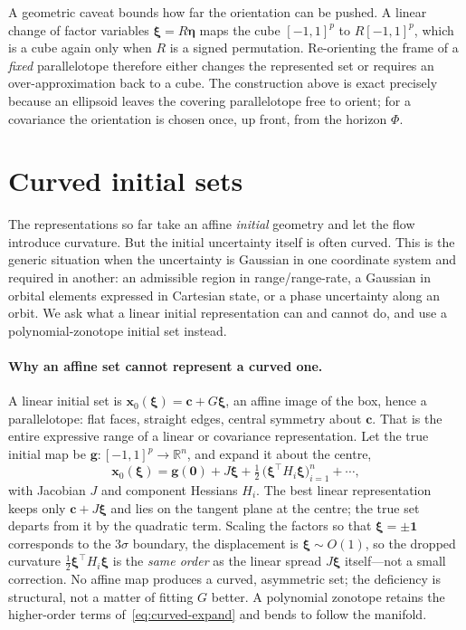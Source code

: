 \documentclass[11pt]{article}
\newcommand{\R}{\mathbb{R}}
\newcommand{\bx}{\bm{x}}
\newcommand{\bxi}{\bm{\xi}}
\newcommand{\bc}{\bm{c}}
\begin{document}
A geometric caveat bounds how far the orientation can be pushed. A linear change
of factor variables $\bxi = R\bm{\eta}$ maps the cube $[-1,1]^p$ to
$R[-1,1]^p$, which is a cube again only when $R$ is a signed permutation.
Re-orienting the frame of a \emph{fixed} parallelotope therefore either changes
the represented set or requires an over-approximation back to a cube. The
construction above is exact precisely because an ellipsoid leaves the covering
parallelotope free to orient; for a covariance the orientation is chosen once,
up front, from the horizon $\Phi$.

\section{Curved initial sets}
\label{sec:curved}

The representations so far take an affine \emph{initial} geometry and let the
flow introduce curvature. But the initial uncertainty itself is often curved.
This is the generic situation when the uncertainty is Gaussian in one coordinate
system and required in another: an admissible region in range/range-rate, a
Gaussian in orbital elements expressed in Cartesian state, or a phase
uncertainty along an orbit. We ask what a linear initial representation can and
cannot do, and use a polynomial-zonotope initial set instead.

\paragraph{Why an affine set cannot represent a curved one.}
A linear initial set is $\bx_0(\bxi) = \bc + G\bxi$, an affine image of the box,
hence a parallelotope: flat faces, straight edges, central symmetry about $\bc$.
That is the entire expressive range of a linear or covariance representation. Let
the true initial map be $\bm{g} : [-1,1]^p \to \R^n$, and expand it about the
centre,
\begin{equation}
  \bx_0(\bxi) = \bm{g}(\bm 0) + J\bxi
    + \tfrac12\,\big(\bxi^\top H_i \bxi\big)_{i=1}^{n} + \cdots,
  \label{eq:curved-expand}
\end{equation}
with Jacobian $J$ and component Hessians $H_i$. The best linear representation
keeps only $\bc + J\bxi$ and lies on the tangent plane at the centre; the true
set departs from it by the quadratic term. Scaling the factors so that
$\bxi = \pm\bm{1}$ corresponds to the $3\sigma$ boundary, the displacement is
$\bxi \sim O(1)$, so the dropped curvature $\tfrac12 \bxi^\top H_i \bxi$ is the
\emph{same order} as the linear spread $J\bxi$ itself---not a small correction.
No affine map produces a curved, asymmetric set; the deficiency is structural,
not a matter of fitting $G$ better. A polynomial zonotope retains the
higher-order terms of~\eqref{eq:curved-expand} and bends to follow the manifold.
\end{document}
